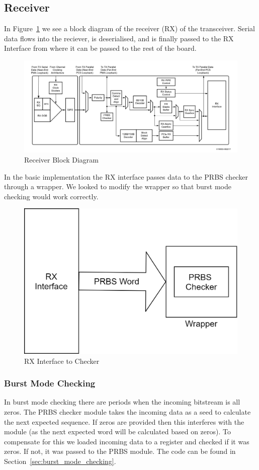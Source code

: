 \subsection{Receiver}%
\label{sub:receiver}
In Figure~\ref{fig:receiver_block} we see a block diagram of the receiver
(RX) of the transceiver. Serial data flows into the reciever, is deserialised,
and is finally passed to the RX Interface from where it can be passed to the
rest of the board. 
\begin{figure}[ht]
    \centering
    \hspace*{-1cm}\includegraphics[width=1.2\linewidth]{img/receiver_block.png}
    \caption{Receiver Block Diagram \cite{GTY_guide}}%
    \label{fig:receiver_block}
\end{figure}

In the basic implementation the RX interface passes data to the PRBS checker
through a wrapper. We looked to modify the wrapper so that burst mode checking
would work correctly.
\begin{figure}[ht]
    \centering
    \includegraphics[width=0.6\linewidth]{img/rx_interface.png}
    \caption{RX Interface to Checker}%
    \label{fig:rx_interface}
\end{figure}
\cleardoublepage
\subsubsection{Burst Mode Checking}%
\label{ssub:burst_mode_checking}
In burst mode checking there are periods when the incoming bitstream is all
zeros. The PRBS checker module takes the incoming data as a seed to calculate
the next expected sequence. If zeros are provided then this interferes with the
module (as the next expected word will be calculated based on zeros). To
compensate for this we loaded incoming data to a register and checked if it was
zeros. If not, it was passed to the PRBS module.
The code can be found in Section~\ref{sec:burst_mode_checking}.  

